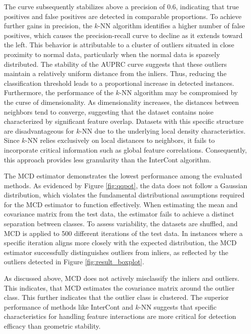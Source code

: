 The curve subsequently stabilizes above a precision of 0.6, indicating that true positives and false positives are detected in comparable proportions. 
To achieve further gains in precision, the $k$-NN algorithm identifies a higher number of false positives, which causes the precision-recall curve to decline as it extends toward the left. 
This behavior is attributable to a cluster of outliers situated in close proximity to normal data, particularly when the normal data is sparsely distributed. 
The stability of the AUPRC curve suggests that these outliers maintain a relatively uniform distance from the inliers.
Thus, reducing the classification threshold leads to a proportional increase in detected instances. 
Furthermore, the performance of the $k$-NN algorithm may be compromised by the curse of dimensionality. 
As dimensionality increases, the distances between neighbors tend to converge, suggesting that the dataset contains noise characterized by significant feature overlap. 
Datasets with this specific structure are disadvantageous for $k$-NN due to the underlying local density characteristics. 
Since $k$-NN relies exclusively on local distances to neighbors, it fails to incorporate critical information such as global feature correlations. 
Consequently, this approach provides less granularity than the InterCont algorithm.


The MCD estimator demonstrates the lowest performance among the evaluated methods. As evidenced by Figure \ref{fig:qqpot}, the data does not follow a Gaussian distribution, which violates the fundamental distributional assumptions required for the MCD estimator to function effectively. 
When estimating the mean and covariance matrix from the test data, the estimator fails to achieve a distinct separation between classes. To assess variability, the datasets are shuffled, and MCD is applied to 500 different iterations of the test data. 
In instances where a specific iteration aligns more closely with the expected distribution, the MCD estimator successfully distinguishes outliers from inliers, as reflected by the outliers detected in Figure \ref{fig:result_boxplot}.

As discussed above, MCD does not actively misclassify the inliers and outliers.
This indicates, that MCD estimates the covariance matrix around the outlier class.
This further indicates that the outlier class is clustered. 
The superior performance of methods like InterCont and $k$-NN suggests that specific characteristics for handling feature interactions are more critical for detection efficacy than geometric stability. 


